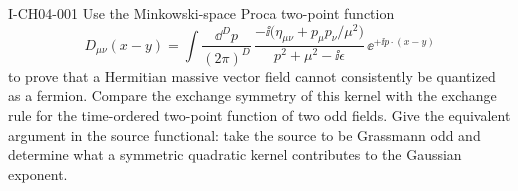 \begin{exercise}{I-CH04-001}
Use the Minkowski-space Proca two-point function
\begin{equation*}
 D_{\mu\nu}(x-y)
 =\int\frac{\dd^D p}{(2\pi)^D}\,
 \frac{-\ii\bigl(\eta_{\mu\nu}+p_\mu p_\nu/\mu^2\bigr)}
 {p^2+\mu^2-\ii\epsilon}\,
 \ee^{+\ii p\cdot(x-y)}
\end{equation*}
to prove that a Hermitian massive vector field cannot consistently be
quantized as a fermion.  Compare the exchange symmetry of this kernel with
the exchange rule for the time-ordered two-point function of two odd fields.
Give the equivalent argument in the source functional: take the source to be
Grassmann odd and determine what a symmetric quadratic kernel contributes to
the Gaussian exponent.
\end{exercise}
